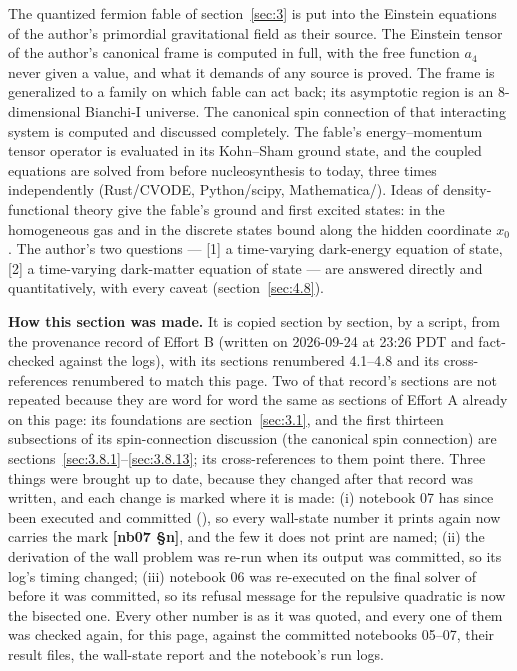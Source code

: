 The quantized fermion fable of section~\ref{sec:3} is put into the Einstein equations of the author's primordial gravitational field as their source. The Einstein tensor of the author's canonical frame is computed in full, with the free function $a_{4}$ never given a value, and what it demands of any source is proved. The frame is generalized to a family on which fable can act back; its asymptotic region is an 8-dimensional Bianchi-I universe. The canonical spin connection of that interacting system is computed and discussed completely. The fable's energy--momentum tensor operator is evaluated in its Kohn--Sham ground state, and the coupled equations are solved from before nucleosynthesis to today, three times independently (Rust/CVODE, Python/scipy, Mathematica/). Ideas of density-functional theory give the fable's ground and first excited states: in the homogeneous gas and in the discrete states bound along the hidden coordinate $x_{0}$. The author's two questions --- [1] a time-varying dark-energy equation of state, [2] a time-varying dark-matter equation of state --- are answered directly and quantitatively, with every caveat (section~\ref{sec:4.8}).

\textbf{How this section was made.} It is copied section by section, by a script, from the provenance record of Effort B (written on 2026-09-24 at 23:26 PDT and fact-checked against the logs), with its sections renumbered 4.1--4.8 and its cross-references renumbered to match this page. Two of that record's sections are not repeated because they are word for word the same as sections of Effort A already on this page: its foundations are section~\ref{sec:3.1}, and the first thirteen subsections of its spin-connection discussion (the canonical spin connection) are sections~\ref{sec:3.8.1}--\ref{sec:3.8.13}; its cross-references to them point there. Three things were brought up to date, because they changed after that record was written, and each change is marked where it is made: (i) notebook 07 has since been executed and committed (), so every wall-state number it prints again now carries the mark \textbf{[nb07 \S{}n]}, and the few it does not print are named; (ii) the derivation of the wall problem was re-run when its output  was committed, so its log's timing changed; (iii) notebook 06 was re-executed on the final solver of  before it was committed, so its refusal message for the repulsive quadratic is now the bisected one. Every other number is as it was quoted, and every one of them was checked again, for this page, against the committed notebooks 05--07, their result files, the wall-state report and the notebook's run logs.

